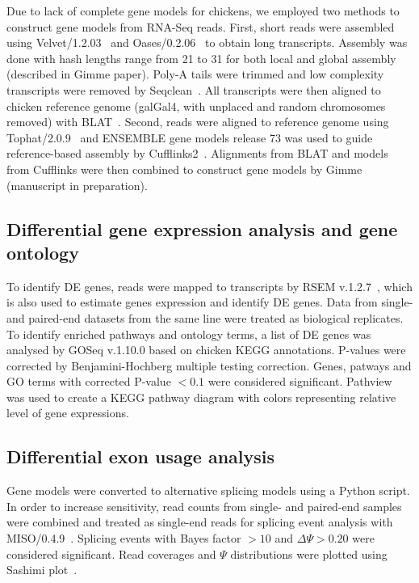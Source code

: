 \documentclass[10pt]{article}
\begin{document}
Due to lack of complete gene models for chickens, we employed two
methods to construct gene models from RNA-Seq reads.  First,
short reads were assembled using
Velvet/1.2.03~\cite{Zerbino:2008vu} and
Oases/0.2.06~\cite{Schulz:2012je} to obtain long transcripts.
Assembly was done with hash lengths range from 21 to 31 for both
local and global assembly (described in Gimme paper).  Poly-A
tails were trimmed and low complexity transcripts were removed by
Seqclean~\cite{seqclean}.  All transcripts were then aligned to
chicken reference genome (galGal4, with unplaced and random
chromosomes removed) with BLAT~\cite{Kent:2002tv}.  Second, reads
were aligned to reference genome using
Tophat/2.0.9~\cite{Trapnell:2009dp} and ENSEMBLE gene models
release 73 was used to guide reference-based assembly by
Cufflinks2~\cite{Trapnell:2010kd}.  Alignments from BLAT and
models from Cufflinks were then combined to construct gene models
by Gimme (manuscript in preparation).

\subsection*{Differential gene expression analysis and gene
ontology}

To identify DE genes, reads were mapped to transcripts by RSEM
v.1.2.7~\cite{li2011rsem}, which is also used to estimate genes
expression and identify DE genes.  Data from single- and
paired-end datasets from the same line were treated as biological
replicates.  To identify enriched pathways and ontology terms, a
list of DE genes was analysed by GOSeq v.1.10.0 based on chicken
KEGG annotations.  P-values were corrected by Benjamini-Hochberg
multiple testing correction.  Genes, patways and GO terms with
corrected P-value $<0.1$ were considered significant.
Pathview~\cite{luo2013pathview} was used to create a KEGG pathway
diagram with colors representing relative level of gene
expressions.

\subsection*{Differential exon usage analysis}

Gene models were converted to alternative splicing models using a
Python script.  In order to increase sensitivity, read counts
from single- and paired-end samples were combined and treated as
single-end reads for splicing event analysis with
MISO/0.4.9~\cite{Katz:2010iv}.  Splicing events with Bayes factor
$>10$ and $\Delta\Psi>0.20$ were considered significant.  Read
coverages and $\Psi$ distributions were plotted using Sashimi
plot~\cite{Katz:2013vx}.
\end{document}
